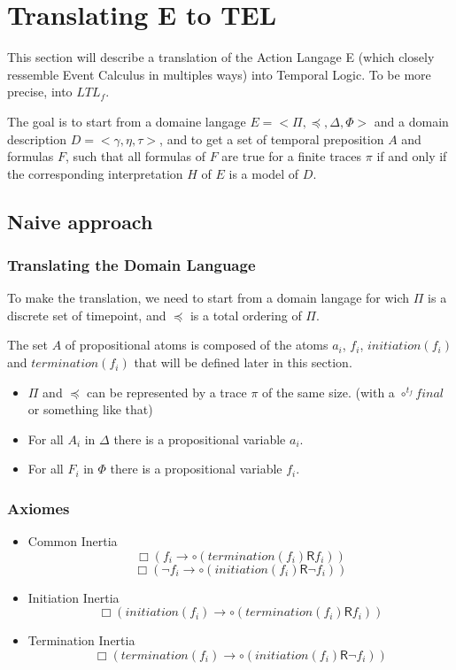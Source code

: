 \section{Translating E to TEL}\label{sec:etotemp}

This section will describe a translation of the Action Langage E (which closely ressemble Event Calculus in multiples ways) into Temporal Logic.
To be more precise, into $LTL_f$.

The goal is to start from a domaine langage $E=<\Pi,\preceq,\Delta,\Phi>$ and a domain description $D=<\gamma,\eta,\tau>$, and to get a set of temporal preposition $A$ and formulas $F$, such that all formulas of $F$ are true for a finite traces $\pi$ if and only if the corresponding interpretation $H$ of $E$ is a model of $D$.

\subsection{Naive approach}

\subsubsection{Translating the Domain Language}

To make the translation, we need to start from a domain langage for wich $\Pi$ is a discrete set of timepoint, and $\preceq$ is a total ordering of $\Pi$.

The set $A$ of propositional atoms is composed of the atoms $a_i$, $f_i$, $initiation(f_i)$ and $termination(f_i)$ that will be defined later in this section.

\begin{itemize}
  \item $\Pi$ and $\preceq$ can be represented by a trace $\pi$ of the same size. (with a $\circ^{t_f}final$ or something like that)
  \item For all $A_i$ in $\Delta$ there is a propositional variable $a_i$.
  \item For all $F_i$ in $\Phi$ there is a propositional variable $f_i$.
\end{itemize}

\subsubsection{Axiomes}

\begin{itemize}
  \item Common Inertia
  $$\Box(f_i\rightarrow\circ (termination(f_i) \mathbin{\bm{\mathsf{R}}} f_i))$$
  $$\Box(\neg f_i\rightarrow\circ (initiation(f_i) \mathbin{\bm{\mathsf{R}}} \neg f_i))$$
  \item Initiation Inertia $$\Box(initiation(f_i)\rightarrow\circ (termination(f_i) \mathbin{\bm{\mathsf{R}}} f_i))$$
  \item Termination Inertia $$\Box(termination(f_i)\rightarrow\circ (initiation(f_i) \mathbin{\bm{\mathsf{R}}} \neg f_i))$$
\end{itemize}

